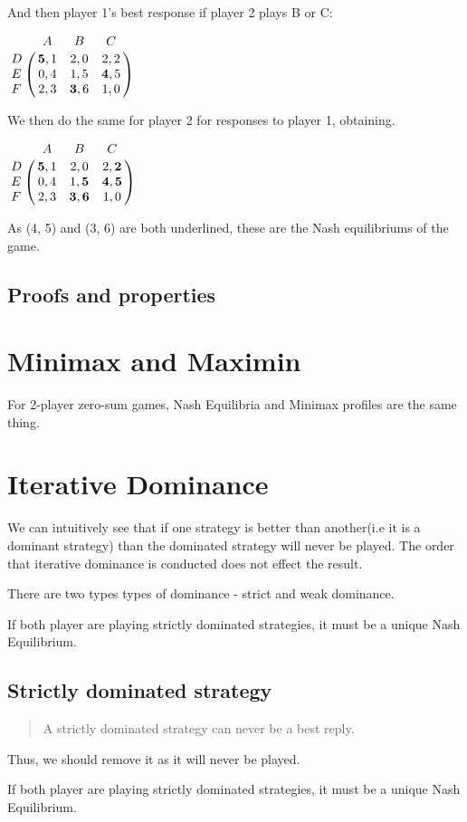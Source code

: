 \documentclass[11pt]{report}
\begin{document}
And then player 1's best response if player 2 plays B or C:
\begin{center}
$ \bordermatrix{~ & A & B & C \cr 
				D & \textbf{5}, 1 & 2, 0 & 2, 2 \cr 
				E & 0, 4 & 1, 5 & \textbf{4}, 5 \cr
				F & 2, 3 & \textbf{3}, 6 & 1, 0 \cr}$  
\end{center}		
We then do the same for player 2 for responses to player 1, obtaining.
\begin{center}
$ \bordermatrix{~ & A & B & C \cr 
				D & \textbf{5}, 1 & 2, 0 & 2, \textbf{2} \cr 
				E & 0, 4 & 1, \textbf{5} & \textbf{4}, \textbf{5} \cr
				F & 2, 3 & \textbf{3}, \textbf{6} & 1, 0 \cr}$  
\end{center}		
As (4, 5) and (3, 6) are both underlined, these are the Nash equilibriums of the game.
			   

\section{Proofs and properties}

\chapter{Minimax and Maximin}
For 2-player zero-sum games, Nash Equilibria and Minimax profiles are the same thing. 

\chapter{Iterative Dominance}
We can intuitively see that if one strategy is better than another(i.e it is a dominant strategy) than the dominated strategy will never be played. The order that iterative dominance is conducted does not effect the result.

There are two types types of dominance - strict and weak dominance.

If both player are playing strictly dominated strategies, it must be a unique Nash Equilibrium. 

\section*{Strictly dominated strategy}
\begin{quote}
A strictly dominated strategy can never be a best reply.
\end{quote}
Thus, we should remove it as it will never be played. 

If both player are playing strictly dominated strategies, it must be a unique Nash Equilibrium. 
\end{document}
